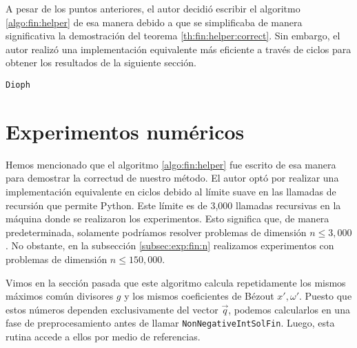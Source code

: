 A pesar de los puntos anteriores, el autor decidió escribir el algoritmo \ref{algo:fin:helper} de
esa manera debido a que se simplificaba de manera significativa la demostración del teorema
\ref{th:fin:helper:correct}. Sin embargo, el autor realizó una implementación equivalente más
eficiente a través de ciclos para obtener los resultados de la siguiente sección.

\begin{algorithm}[ht]
	\LinesNumbered
	\caption{\texttt{Dioph}}
	\label{algo:fin:dioph}
\end{algorithm}

\section{Experimentos numéricos}
\noindent
Hemos mencionado que el algoritmo \ref{algo:fin:helper} fue escrito de esa manera para demostrar la
correctud de nuestro método. El autor optó por realizar una implementación equivalente en ciclos
debido al límite suave en las llamadas de recursión que permite Python. Este límite es de 3,000
llamadas recursivas en la máquina donde se realizaron los experimentos. Esto significa que, de
manera predeterminada, solamente podríamos resolver problemas de dimensión $n \leq 3,000$. No
obstante, en la subsección \ref{subsec:exp:fin:n} realizamos experimentos con problemas de dimensión
$n \leq 150,000$.

Vimos en la sección pasada que este algoritmo calcula repetidamente los mismos
máximos común divisores $g$ y los mismos coeficientes de Bézout $x', \omega'$. Puesto que estos
números dependen exclusivamente del vector $\vec{q}$, podemos calcularlos en una fase de
preprocesamiento antes de llamar \texttt{NonNegativeIntSolFin}. Luego, esta rutina accede a ellos
por medio de referencias.

